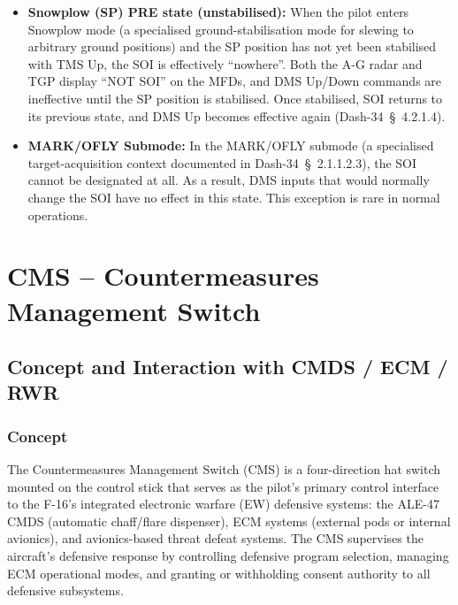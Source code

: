 \documentclass[11pt,a4paper]{article}
\providecommand{\dashref}[1]{Dash-34~\S~#1}
\begin{document}
\begin{itemize}
  \item \textbf{Snowplow (SP) PRE state (unstabilised):} When the pilot enters Snowplow mode (a specialised ground-stabilisation mode for slewing to arbitrary ground positions) and the SP position has not yet been stabilised with TMS Up, the SOI is effectively ``nowhere''. Both the A-G radar and TGP display ``NOT SOI'' on the MFDs, and DMS Up/Down commands are ineffective until the SP position is stabilised. Once stabilised, SOI returns to its previous state, and DMS Up becomes effective again (\dashref{4.2.1.4}).
  \item \textbf{MARK/OFLY Submode:} In the MARK/OFLY submode (a specialised target-acquisition context documented in \dashref{2.1.1.2.3}), the SOI cannot be designated at all. As a result, DMS inputs that would normally change the SOI have no effect in this state. This exception is rare in normal operations.
\end{itemize}

\section{CMS -- Countermeasures Management Switch}\label{sec:C5}

\subsection{Concept and Interaction with CMDS / ECM / RWR}\label{sec:C5-S1}

\subsubsection{Concept}\label{sec:C5-S1-S1}

The Countermeasures Management Switch (CMS) is a four-direction hat switch mounted on the control stick that serves as the pilot's primary control interface to the F-16's integrated electronic warfare (EW) defensive systems: the ALE-47 CMDS (automatic chaff/flare dispenser), ECM systems (external pods or internal avionics), and avionics-based threat defeat systems. The CMS supervises the aircraft's defensive response by controlling defensive program selection, managing ECM operational modes, and granting or withholding consent authority to all defensive subsystems.
\end{document}
